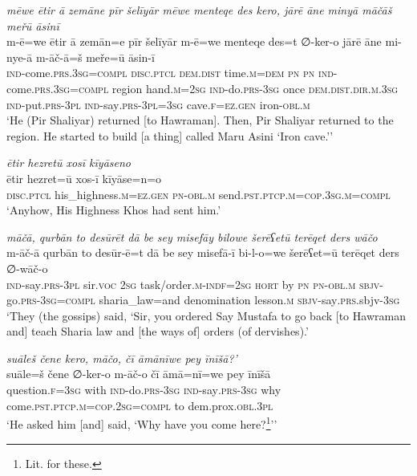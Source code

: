 \ea \label{ŽP.116}
\textit{mēwe ētir ā zemāne pīr šelīyār mēwe menteqe des kero, jārē āne minyā māčāš meřū āsinī} \\ 
\gll m-ē=we ētir ā zemān=e pīr šelīyār m-ē=we menteqe des=t ∅-ker-o jārē āne mi-nye-ā m-āč-ā=š meře=ū āsin-ī \\ 
 \textsc{ind-}come\textsc{.prs}\textsc{.3sg}\textsc{=compl} \textsc{disc.ptcl} \textsc{dem.dist} time\textsc{.m}\textsc{=dem} \textsc{pn} \textsc{pn} \textsc{ind-}come\textsc{.prs}\textsc{.3sg}\textsc{=compl} region hand\textsc{.m}\textsc{=\textsc{2sg}} \textsc{ind-}do\textsc{.prs}\textsc{-3sg} once \textsc{dem.dist}\textsc{.dir}\textsc{.m}\textsc{.3sg} \textsc{ind-}put\textsc{.prs}\textsc{-3pl} \textsc{ind-}say\textsc{.prs}\textsc{-3pl}\textsc{=3sg} cave\textsc{.f}\textsc{\textsc{=ez.gen}} iron\textsc{-obl}\textsc{.m} \\ 
\glt `He (Pir Shaliyar) returned [to Hawraman]. Then, Pir Shaliyar returned to the region. He started to build [a thing] called Maru Asini ‘Iron cave.’'
\z 
 
\ea \label{ŽP.117}
\textit{ētir hezretū xosī kīyāseno} \\ 
\gll ētir hezret=ū xos-ī kīyāse=n=o \\ 
 \textsc{disc.ptcl} his\_highness\textsc{.m}\textsc{\textsc{=ez.gen}} \textsc{pn}\textsc{-obl}\textsc{.m} send\textsc{.pst}\textsc{.ptcp}\textsc{.m}\textsc{=cop}\textsc{.3sg}\textsc{.m}\textsc{=compl} \\ 
\glt `Anyhow, His Highness Khos had sent him.'
\z 
 
\ea \label{ŽP.126}
\textit{māčā, qurbān to desūrēt dā be sey misefāy bilowe šerēʕetū terēqet ders wāčo} \\ 
\gll m-āč-ā qurbān to desūr-ē=t dā be sey misefā-ī bi-l-o=we šerēʕet=ū terēqet ders ∅-wāč-o \\ 
 \textsc{ind-}say\textsc{.prs}\textsc{-3pl} sir.\textsc{voc} \textsc{2sg} task/order\textsc{.m}\textsc{-indf}\textsc{=\textsc{2sg}} \textsc{hort} by \textsc{pn} \textsc{pn}\textsc{-obl}\textsc{.m} \textsc{sbjv-}go\textsc{.prs}\textsc{-3sg}\textsc{=compl} sharia\_law=and denomination lesson\textsc{.m} \textsc{sbjv-}say\textsc{.prs}.sbjv\textsc{-3sg} \\ 
\glt `They (the gossips) said, ‘Sir, you ordered Say Mustafa to go back [to Hawraman and] teach Sharia law and [the ways of] orders (of dervishes).'
\z 
 
\ea \label{ŽP.135}
\textit{suāleš čene kero, māčo, čī āmānīwe pey īnīšā?’} \\ 
\gll suāle=š čene ∅-ker-o m-āč-o čī āmā=nī=we pey īnīšā \\ 
 question\textsc{.f}\textsc{=3sg} with \textsc{ind-}do\textsc{.prs}\textsc{-3sg} \textsc{ind-}say\textsc{.prs}\textsc{-3sg} why come\textsc{.pst}\textsc{.ptcp}\textsc{.m}\textsc{=cop}\textsc{.\textsc{2sg}}\textsc{=compl} to dem.prox\textsc{.obl}\textsc{.3pl} \\ 
\glt `He asked him [and] said, ‘Why have you come here?\footnote{Lit. for these.}’'
\z 
 
